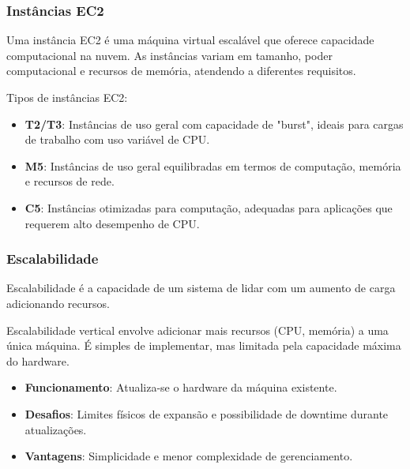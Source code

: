 \subsubsection{Instâncias EC2}

Uma instância EC2 é uma máquina virtual escalável que oferece capacidade computacional na nuvem. As instâncias variam em tamanho, poder computacional e recursos de memória, atendendo a diferentes requisitos.

Tipos de instâncias EC2:

\begin{itemize}
    \item \textbf{T2/T3}: Instâncias de uso geral com capacidade de "burst", ideais para cargas de trabalho com uso variável de CPU.
    \item \textbf{M5}: Instâncias de uso geral equilibradas em termos de computação, memória e recursos de rede.
    \item \textbf{C5}: Instâncias otimizadas para computação, adequadas para aplicações que requerem alto desempenho de CPU.
\end{itemize}

\subsubsection{Escalabilidade}


Escalabilidade é a capacidade de um sistema de lidar com um aumento de carga adicionando recursos.

Escalabilidade vertical envolve adicionar mais recursos (CPU, memória) a uma única máquina. É simples de implementar, mas limitada pela capacidade máxima do hardware.

\begin{itemize}
    \item \textbf{Funcionamento}: Atualiza-se o hardware da máquina existente.
    \item \textbf{Desafios}: Limites físicos de expansão e possibilidade de downtime durante atualizações.
    \item \textbf{Vantagens}: Simplicidade e menor complexidade de gerenciamento.
\end{itemize}

